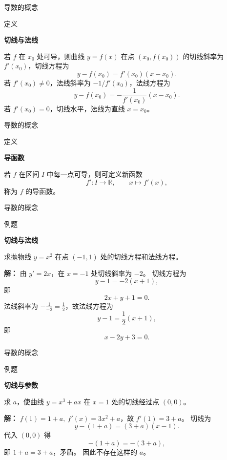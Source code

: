 \documentclass[aspectratio=169,10pt,fontset=fandol]{ctexbeamer}
\newcommand{\RR}{\mathbb{R}}
\begin{document}
\begin{frame}[t,fragile]{导数的概念}
\normalsize
\begin{block}{定义}
{\normalsize
\textbf{切线与法线}\par

若 $f$ 在 $x_0$ 处可导，则曲线 $y=f(x)$ 在点 $(x_0,f(x_0))$ 的切线斜率为 $f'(x_0)$，切线方程为
\[
y-f(x_0)=f'(x_0)(x-x_0).
\]
若 $f'(x_0)\neq0$，法线斜率为 $-1/f'(x_0)$，法线方程为
\[
y-f(x_0)=-\frac{1}{f'(x_0)}(x-x_0).
\]
若 $f'(x_0)=0$，切线水平，法线为直线 $x=x_0$。

}
\end{block}
\end{frame}
\begin{frame}[t,fragile]{导数的概念}
\normalsize
\begin{block}{定义}
{\normalsize
\textbf{导函数}\par

若 $f$ 在区间 $I$ 中每一点可导，则可定义新函数
\[
f':I\to\RR,\qquad x\mapsto f'(x),
\]
称为 $f$ 的导函数。

}
\end{block}
\end{frame}
\begin{frame}[t,fragile]{导数的概念}
\small
\begin{block}{例题}
{\small
\textbf{切线与法线}\par

求抛物线 $y=x^2$ 在点 $(-1,1)$ 处的切线方程和法线方程。

}
\end{block}
\pause
{\small
\textbf{解：}
由 $y'=2x$，在 $x=-1$ 处切线斜率为 $-2$。 切线方程为
\[
y-1=-2(x+1),
\]
即
\[
2x+y+1=0.
\]
法线斜率为 $-\frac1{-2}=\frac12$，故法线方程为
\[
y-1=\frac12(x+1),
\]
即
\[
x-2y+3=0.
\]

}
\end{frame}
\begin{frame}[t,fragile]{导数的概念}
\normalsize
\begin{block}{例题}
{\normalsize
\textbf{切线与参数}\par

求 $a$，使曲线 $y=x^3+ax$ 在 $x=1$ 处的切线经过点 $(0,0)$。

}
\end{block}
\pause
{\normalsize
\textbf{解：}
$f(1)=1+a,\ f'(x)=3x^2+a$，故 $f'(1)=3+a$。 切线为
\[
y-(1+a)=(3+a)(x-1).
\]
代入 $(0,0)$ 得
\[
-(1+a)=-(3+a),
\]
即 $1+a=3+a$，矛盾。 因此不存在这样的 $a$。

}
\end{frame}
\end{document}
